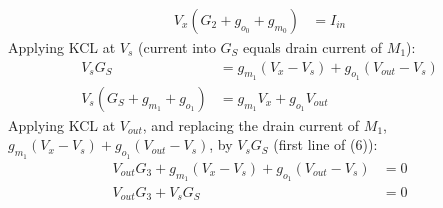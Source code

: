 \begin{enumerate}
\begin{align*}
      V_x(G_2 + g_{o_0} + g_{m_0}) &= I_{in} \tag{5}
    \end{align*}
    Applying KCL at $V_{s}$ (current into \(G_S\) equals drain current of \(M_1\)):
    \begin{align*}
      V_s G_S &= g_{m_1}(V_x - V_s) + g_{o_1}(V_{out} - V_s) \\
      V_s (G_S + g_{m_1} + g_{o_1}) &= g_{m_1} V_x + g_{o_1} V_{out} \tag{6}
    \end{align*}
    Applying KCL at $V_{out}$, and replacing the drain current of \(M_1\),
    \(g_{m_1}(V_x - V_s) + g_{o_1}(V_{out} - V_s)\), by \(V_s G_S\) (first line of (6)):
    \begin{align*}
      V_{out} G_3 + g_{m_1}(V_x - V_s) + g_{o_1}(V_{out} - V_s) &= 0 \\
      V_{out} G_3 + V_s G_S &= 0 \tag{7}
    \end{align*}
\end{enumerate}

